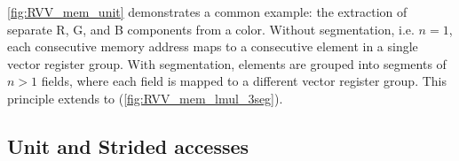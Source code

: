 \cref{fig:RVV_mem_unit} demonstrates a common example: the extraction of separate R, G, and B components from a color.
Without segmentation, i.e. $n = 1$, each consecutive memory address maps to a consecutive element in a single vector register group.
With segmentation, elements are grouped into segments of $n > 1$ fields, where each field is mapped to a different vector register group.
This principle extends to  (\cref{fig:RVV_mem_lmul_3seg}).




\pagebreak
\subsection{Unit and Strided accesses}\label{chap:bg:sec:rvv:unitstrideaccess}

